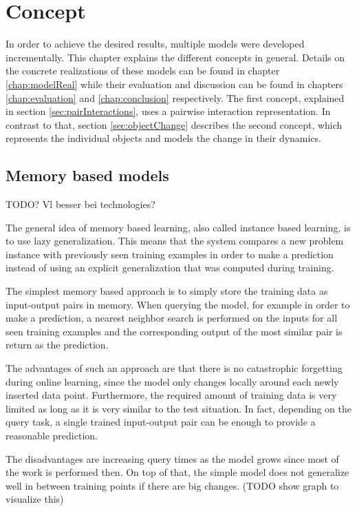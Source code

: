 \chapter{Concept}

In order to achieve the desired results, multiple models were 
developed incrementally. This chapter explains the different 
concepts in general. Details on the concrete realizations of these models can 
be found in chapter \ref{chap:modelReal} while their evaluation and discussion 
can be found in chapters \ref{chap:evaluation} and \ref{chap:conclusion} 
respectively. %
The first concept, explained in section \ref{sec:pairInteractions}, uses a 
pairwise interaction representation. In contrast to that, section 
\ref{sec:objectChange} describes the second concept, which represents the 
individual objects and models the change in their dynamics.

\section{Memory based models\label{sec:mbm}}
TODO? Vl besser bei technologies?

The general idea of memory based learning, also called instance based learning, is to use lazy 
generalization. This means that the system compares a new problem instance with previously seen 
training examples in order to make a prediction instead of using an explicit generalization that 
was computed during training. 

The simplest memory based approach is to simply store the training data as 
input-output pairs in memory. When querying the model, for example in order to 
make a prediction, a nearest neighbor search \cite{nearestNeighbor} is 
performed on the inputs for all seen training examples and the corresponding 
output of the most similar pair is return as the prediction.

The advantages of such an approach are that there is no catastrophic forgetting during online 
learning, since the model only changes locally around each newly inserted data 
point. Furthermore, the required amount of training data is very limited as 
long as it is very similar to the test situation. In fact, depending on the 
query task, a single trained input-output pair can be enough to provide a 
reasonable prediction. 

The disadvantages are increasing query times as the model grows since most of the work is performed then. On top of that, the simple model does not generalize well in between training points if there are big changes. (TODO show graph to visualize this) %


